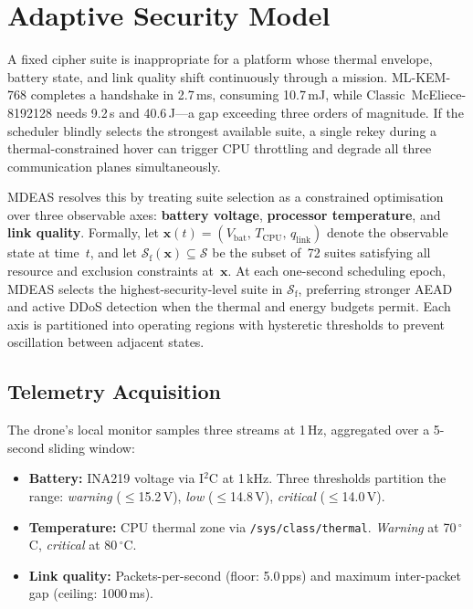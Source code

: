 \documentclass[conference]{IEEEtran}
\newcommand{\mdeas}{\textsc{MDEAS}}
\begin{document}
\section{Adaptive Security Model}
\label{sec:mdeas}

A fixed cipher suite is inappropriate for a platform whose thermal
envelope, battery state, and link quality shift continuously through
a mission.  ML-KEM-768 completes a handshake in 2.7\,ms, consuming
10.7\,mJ, while Classic~McEliece-8192128 needs 9.2\,s and 40.6\,J---a
gap exceeding three orders of magnitude.  If the scheduler blindly
selects the strongest available suite, a single rekey during a
thermal-constrained hover can trigger CPU throttling and degrade all
three communication planes simultaneously.

\mdeas{} resolves this by treating suite selection as a constrained
optimisation over three observable axes: \textbf{battery voltage},
\textbf{processor temperature}, and \textbf{link quality}.
Formally, let $\mathbf{x}(t) = (V_\text{bat},\, T_\text{CPU},\,
q_\text{link})$ denote the observable state at time~$t$,
and let $\mathcal{S}_\text{f}(\mathbf{x}) \subseteq \mathcal{S}$
be the subset of~72 suites satisfying all resource and exclusion
constraints at~$\mathbf{x}$.  At each one-second scheduling
epoch, \mdeas{} selects the highest-security-level suite in
$\mathcal{S}_\text{f}$, preferring stronger AEAD and active DDoS
detection when the thermal and energy budgets permit.
Each axis is partitioned into operating regions with hysteretic
thresholds to prevent oscillation between adjacent states.

\subsection{Telemetry Acquisition}
\label{sec:telemetry}

The drone's local monitor samples three streams at 1\,Hz, aggregated
over a 5-second sliding window:

\begin{itemize}
  \item \textbf{Battery:} INA219 voltage via I$^2$C at 1\,kHz.
    Three thresholds partition the range:
    \emph{warning} ($\leq$15.2\,V),
    \emph{low} ($\leq$14.8\,V),
    \emph{critical} ($\leq$14.0\,V).

  \item \textbf{Temperature:} CPU thermal zone via
    \texttt{/sys/class/thermal}.
    \emph{Warning} at 70\,$^\circ$C, \emph{critical} at 80\,$^\circ$C.

  \item \textbf{Link quality:} Packets-per-second (floor: 5.0\,pps)
    and maximum inter-packet gap (ceiling: 1000\,ms).
\end{itemize}
\end{document}
